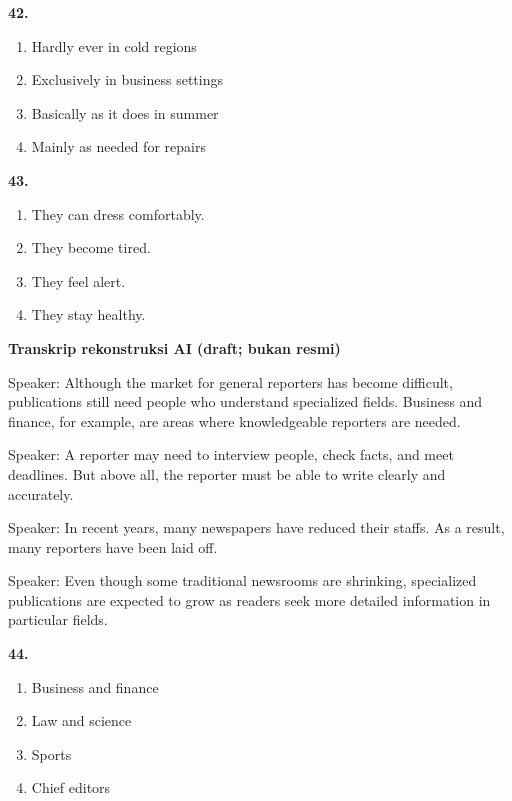 \documentclass[12pt]{article}
\begin{document}
\par
\vspace{0.25\baselineskip}
\noindent\textbf{42.}
\begin{enumerate}[label=(\Alph*),leftmargin=*,itemsep=0.2em]
\item Hardly ever in cold regions
\item Exclusively in business settings
\item Basically as it does in summer
\item Mainly as needed for repairs
\end{enumerate}
\par
\vspace{0.25\baselineskip}
\noindent\textbf{43.}
\begin{enumerate}[label=(\Alph*),leftmargin=*,itemsep=0.2em]
\item They can dress comfortably.
\item They become tired.
\item They feel alert.
\item They stay healthy.
\end{enumerate}
\par
\vspace{0.25\baselineskip}
\begin{exampleblock}
\textbf{Transkrip rekonstruksi AI (draft; bukan resmi)}\par
Speaker: Although the market for general reporters has become difficult, publications still need people who understand specialized fields. Business and finance, for example, are areas where knowledgeable reporters are needed.\par
Speaker: A reporter may need to interview people, check facts, and meet deadlines. But above all, the reporter must be able to write clearly and accurately.\par
Speaker: In recent years, many newspapers have reduced their staffs. As a result, many reporters have been laid off.\par
Speaker: Even though some traditional newsrooms are shrinking, specialized publications are expected to grow as readers seek more detailed information in particular fields.\par
\end{exampleblock}
\noindent\textbf{44.}
\begin{enumerate}[label=(\Alph*),leftmargin=*,itemsep=0.2em]
\item Business and finance
\item Law and science
\item Sports
\item Chief editors
\end{enumerate}
\end{document}
